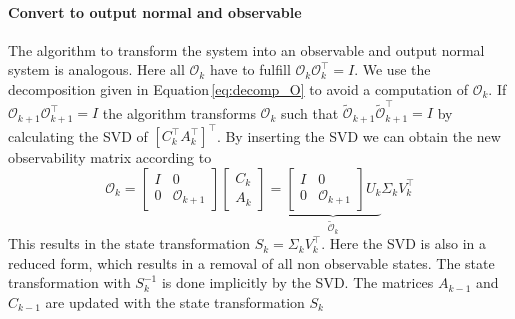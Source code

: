 \documentclass[numbers=noenddot,doctype=mastersthesis,BCOR=15mm,biblatex]{ldvbook}%
\newcommand{\Ob}{\mathcal{O}} %
\newcommand{\eye}{I} %
\begin{document}
\paragraph{Convert to output normal and observable}
The algorithm to transform the system into an observable and output normal system is analogous.
Here all $\Ob_k$ have to fulfill $\Ob_{k} \Ob_{k}^\top=\eye$.
We use the decomposition given in Equation\,\ref{eq:decomp_O} to avoid a computation of $\Ob_k$.
If $\Ob_{k+1} \Ob_{k+1}^\top=\eye$ the algorithm transforms $\Ob_{k}$ such that $\tilde{\Ob}_{k+1} \tilde{\Ob}_{k+1}^\top=\eye$  by calculating the SVD of $[C_k^\top A_k^\top]^\top$.
By inserting the SVD we can obtain the new observability matrix according to
\begin{equation}
	\Ob_{k}
	=
	\begin{bmatrix}
	\eye& 0 \\
	0& \Ob_{k+1}
	\end{bmatrix}
	\begin{bmatrix}
	C_k\\
	A_k
	\end{bmatrix}
	=
	\underbrace{
	\begin{bmatrix}
	\eye& 0 \\
	0& \Ob_{k+1}
	\end{bmatrix}
	U_k}_{\tilde{\Ob}_k}
	\Sigma_k V_k^\top
\end{equation}
This results in the state transformation $S_k = \Sigma_k V_k^\top$.
Here the SVD is also in a reduced form, which results in a removal of all non observable states.
The state transformation with $S_k^{-1}$ is done implicitly by the SVD.
The matrices $A_{k-1}$ and $C_{k-1}$ are updated with the state transformation $S_k$
\end{document}
